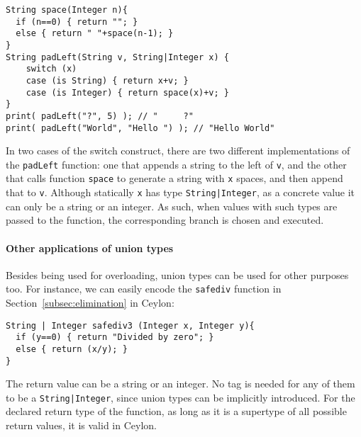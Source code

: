 \begin{lstlisting}
String space(Integer n){
  if (n==0) { return ""; }
  else { return " "+space(n-1); }
}
String padLeft(String v, String|Integer x) {
	switch (x)
	case (is String) { return x+v; }
	case (is Integer) { return space(x)+v; }
}
print( padLeft("?", 5) ); // "     ?"
print( padLeft("World", "Hello ") ); // "Hello World"
\end{lstlisting}
%

\noindent In two cases of the switch construct, there are two different implementations
of the \lstinline{padLeft} function: one that appends a string to the left of \lstinline{v},
and the other that calls function \lstinline{space} to generate a string with \lstinline{x} spaces,
and then append that to \lstinline{v}.
Although statically \lstinline{x} has type \lstinline{String|Integer}, as a concrete value
it can only be a string or an integer.
As such, when values with such types are passed to the function,
the corresponding branch is chosen and executed.

\paragraph{Other applications of union types}
Besides being used for overloading, union types can be used for other purposes too.
For instance, we can easily encode the \lstinline{safediv} function in Section~\ref{subsec:elimination}
in Ceylon:
%
\begin{lstlisting}
String | Integer safediv3 (Integer x, Integer y){
  if (y==0) { return "Divided by zero"; }
  else { return (x/y); }
}
\end{lstlisting}
%
The return value can be a string or an integer.
No tag is needed for any of them to be a \lstinline{String|Integer},
since union types can be implicitly introduced.
For the declared return type of the function, as long as it is
a supertype of all possible return values, it is valid
in Ceylon.

